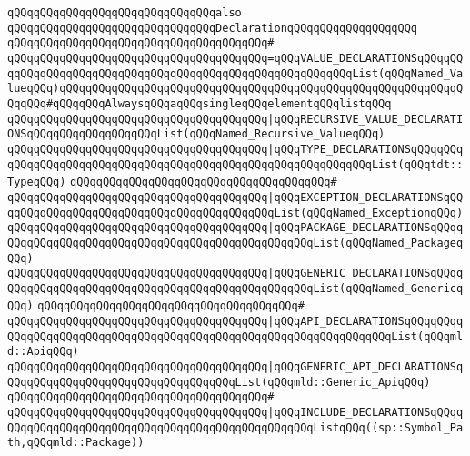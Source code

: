 \newline
\newline
\verb|qQQqqQQqqQQqqQQqqQQqqQQqqQQqqQQqalso|\newline
\verb|qQQqqQQqqQQqqQQqqQQqqQQqqQQqqQQqDeclarationqQQqqQQqqQQqqQQqqQQq|\newline
\verb|qQQqqQQqqQQqqQQqqQQqqQQqqQQqqQQqqQQqqQQq#|\newline
\verb|qQQqqQQqqQQqqQQqqQQqqQQqqQQqqQQqqQQqqQQq=qQQqVALUE_DECLARATIONSqQQqqQQqqQQqqQQqqQQqqQQqqQQqqQQqqQQqqQQqqQQqqQQqqQQqqQQqqQQqList(qQQqNamed_ValueqQQq)qQQqqQQqqQQqqQQqqQQqqQQqqQQqqQQqqQQqqQQqqQQqqQQqqQQqqQQqqQQqqQQqqQQq#qQQqqQQqAlwaysqQQqaqQQqsingleqQQqelementqQQqlistqQQq|\newline
\verb|qQQqqQQqqQQqqQQqqQQqqQQqqQQqqQQqqQQqqQQq|\verb#|qQQqRECURSIVE_VALUE_DECLARATIONSqQQqqQQqqQQqqQQqqQQqList(qQQqNamed_Recursive_ValueqQQq)#\newline
\verb|qQQqqQQqqQQqqQQqqQQqqQQqqQQqqQQqqQQqqQQq|\verb#|qQQqTYPE_DECLARATIONSqQQqqQQqqQQqqQQqqQQqqQQqqQQqqQQqqQQqqQQqqQQqqQQqqQQqqQQqqQQqqQQqList(qQQqtdt::TypeqQQq)#\newline
\verb|qQQqqQQqqQQqqQQqqQQqqQQqqQQqqQQqqQQqqQQq#|\newline
\verb|qQQqqQQqqQQqqQQqqQQqqQQqqQQqqQQqqQQqqQQq|\verb#|qQQqEXCEPTION_DECLARATIONSqQQqqQQqqQQqqQQqqQQqqQQqqQQqqQQqqQQqqQQqqQQqList(qQQqNamed_ExceptionqQQq)#\newline
\verb|qQQqqQQqqQQqqQQqqQQqqQQqqQQqqQQqqQQqqQQq|\verb#|qQQqPACKAGE_DECLARATIONSqQQqqQQqqQQqqQQqqQQqqQQqqQQqqQQqqQQqqQQqqQQqqQQqqQQqList(qQQqNamed_PackageqQQq)#\newline
\verb|qQQqqQQqqQQqqQQqqQQqqQQqqQQqqQQqqQQqqQQq|\verb#|qQQqGENERIC_DECLARATIONSqQQqqQQqqQQqqQQqqQQqqQQqqQQqqQQqqQQqqQQqqQQqqQQqqQQqList(qQQqNamed_GenericqQQq)#\newline
\verb|qQQqqQQqqQQqqQQqqQQqqQQqqQQqqQQqqQQqqQQq#|\newline
\verb|qQQqqQQqqQQqqQQqqQQqqQQqqQQqqQQqqQQqqQQq|\verb#|qQQqAPI_DECLARATIONSqQQqqQQqqQQqqQQqqQQqqQQqqQQqqQQqqQQqqQQqqQQqqQQqqQQqqQQqqQQqqQQqqQQqList(qQQqmld::ApiqQQq)#\newline
\verb|qQQqqQQqqQQqqQQqqQQqqQQqqQQqqQQqqQQqqQQq|\verb#|qQQqGENERIC_API_DECLARATIONSqQQqqQQqqQQqqQQqqQQqqQQqqQQqqQQqqQQqList(qQQqmld::Generic_ApiqQQq)#\newline
\verb|qQQqqQQqqQQqqQQqqQQqqQQqqQQqqQQqqQQqqQQq#|\newline
\verb|qQQqqQQqqQQqqQQqqQQqqQQqqQQqqQQqqQQqqQQq|\verb#|qQQqINCLUDE_DECLARATIONSqQQqqQQqqQQqqQQqqQQqqQQqqQQqqQQqqQQqqQQqqQQqqQQqqQQqListqQQq((sp::Symbol_Path,qQQqmld::Package))#\newline
